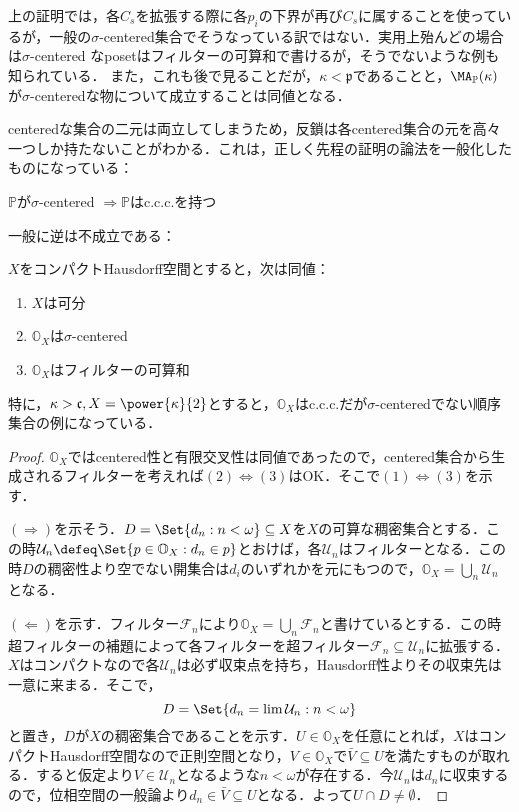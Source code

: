 \documentclass[a4j]{ltjsarticle}
\theoremstyle{definition}
\begin{document}
上の証明では，各$C_s$を拡張する際に各$p_i$の下界が再び$C_s$に属することを使っているが，一般の$\sigma$-centered集合でそうなっている訳ではない．実用上殆んどの場合は$\sigma$-centered なposetはフィルターの可算和で書けるが，そうでないような例も知られている．
また，これも後で見ることだが，$\kappa < \mathfrak{p}$であることと，$\MA_\mathbb{P}(\kappa)$が$\sigma$-centeredな物について成立することは同値となる．

centeredな集合の二元は両立してしまうため，反鎖は各centered集合の元を高々一つしか持たないことがわかる．これは，正しく先程の証明の論法を一般化したものになっている：
\begin{lemma}
 $\mathbb{P}$が$\sigma$-centered $\Rightarrow \mathbb{P}$はc.c.c.を持つ
\end{lemma}

一般に逆は不成立である：

\begin{exercise}
 $X$をコンパクトHausdorff空間とすると，次は同値：
 \begin{enumerate}[label=(\arabic*)]
  \item $X$は可分\label{cond:X-separable}
  \item $\mathbb{O}_X$は$\sigma$-centered\label{OX:sigma-centered}
  \item $\mathbb{O}_X$はフィルターの可算和\label{OX:countable-union-of-filters}
 \end{enumerate}

 特に，$\kappa > \mathfrak{c}, X = \power{\kappa}{2}$とすると，$\mathbb{O}_X$はc.c.c.だが$\sigma$-centeredでない順序集合の例になっている．
\end{exercise}
\begin{proof}
 $\mathbb{O}_X$ではcentered性と有限交叉性は同値であったので，centered集合から生成されるフィルターを考えれば$(2) \Leftrightarrow (3)$はOK．そこで$(1) \Leftrightarrow (3)$を示す．

 $(\Rightarrow)$を示そう．$D = \Set{d_n : n < \omega} \subseteq X$を$X$の可算な稠密集合とする．この時$\mathcal{U}_n \defeq \Set{ p \in \mathbb{O}_X : d_n \in p }$とおけば，各$\mathcal{U}_n$はフィルターとなる．この時$D$の稠密性より空でない開集合は$d_i$のいずれかを元にもつので，$\mathbb{O}_X = \bigcup_n \mathcal{U}_n$となる．

 $(\Leftarrow)$を示す．フィルター$\mathcal{F}_n$により$\mathbb{O}_X = \bigcup_n \mathcal{F}_n$と書けているとする．この時超フィルターの補題によって各フィルターを超フィルター$\mathcal{F}_n \subseteq \mathcal{U}_n$に拡張する．$X$はコンパクトなので各$\mathcal{U}_n$は必ず収束点を持ち，Hausdorff性よりその収束先は一意に来まる．そこで，
 \[
  D = \Set{ d_n = \lim \mathcal{U}_n : n < \omega}
 \]
 と置き，$D$が$X$の稠密集合であることを示す．$U \in \mathbb{O}_X$を任意にとれば，$X$はコンパクトHausdorff空間なので正則空間となり，$V \in \mathbb{O}_X$で$\bar{V} \subseteq U$を満たすものが取れる．すると仮定より$V \in \mathcal{U}_n$となるような$n < \omega$が存在する．今$\mathcal{U}_n$は$d_n$に収束するので，位相空間の一般論より$d_n \in \bar{V} \subseteq U$となる．よって$U \cap D \neq \emptyset$．\mbox{}
\end{proof}
\end{document}

